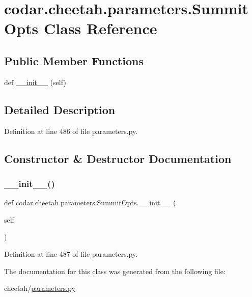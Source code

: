 \hypertarget{classcodar_1_1cheetah_1_1parameters_1_1_summit_opts}{}\section{codar.\+cheetah.\+parameters.\+Summit\+Opts Class Reference}
\label{classcodar_1_1cheetah_1_1parameters_1_1_summit_opts}
\subsection*{Public Member Functions}
\begin{DoxyCompactItemize}
\item 
def \hyperlink{classcodar_1_1cheetah_1_1parameters_1_1_summit_opts_af6fc797d0f898578303c36ea352efbe3}{\+\_\+\+\_\+init\+\_\+\+\_\+} (self)
\end{DoxyCompactItemize}


\subsection{Detailed Description}


Definition at line 486 of file parameters.\+py.



\subsection{Constructor \& Destructor Documentation}
\mbox{\label{classcodar_1_1cheetah_1_1parameters_1_1_summit_opts_af6fc797d0f898578303c36ea352efbe3}} 
\subsubsection{\texorpdfstring{\+\_\+\+\_\+init\+\_\+\+\_\+()}{\_\_init\_\_()}}
{\footnotesize\ttfamily def codar.\+cheetah.\+parameters.\+Summit\+Opts.\+\_\+\+\_\+init\+\_\+\+\_\+ (\begin{DoxyParamCaption}\item[{}]{self }\end{DoxyParamCaption})}



Definition at line 487 of file parameters.\+py.



The documentation for this class was generated from the following file\+:\begin{DoxyCompactItemize}
\item 
cheetah/\hyperlink{parameters_8py}{parameters.\+py}\end{DoxyCompactItemize}
